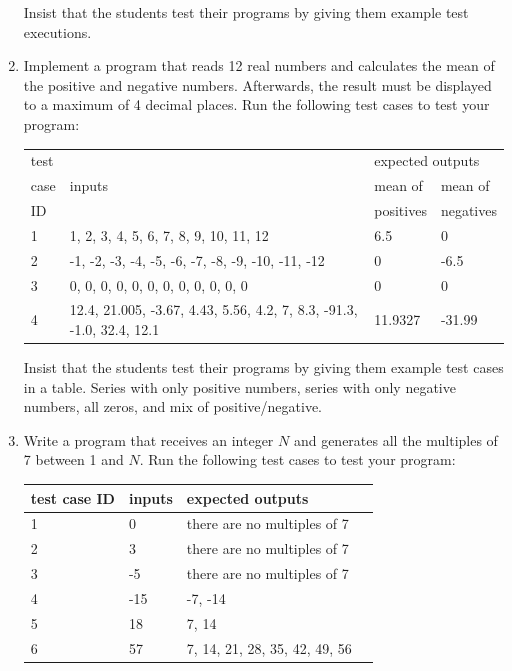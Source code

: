 \documentclass[
  fontsize=10pt,
  a4paper,
]{scrartcl}
\newenvironment{howTILEd}%
  {\begin{mdframed}[skipabove=10pt,skipbelow=10pt,backgroundcolor=pink!40]}%
  {\end{mdframed}}
\begin{document}
\begin{enumerate}
\begin{howTILEd}
Insist that the students test their programs by giving them example test executions. 
\end{howTILEd}



\item Implement a program that reads 12 real numbers and calculates the mean of the positive and negative numbers. Afterwards, the result must be displayed to a maximum of 4 decimal places. Run the following test cases to test your program:

\begin{tabular}{|l|l|l|l|}
\hline
test  & \multirow{3}{*}{inputs} & \multicolumn{2}{l|}{expected outputs}  \\ \cline{3-4} 
case     &  & mean of & mean of     \\
ID       &  & positives & negatives    \\
\hline\hline
1 & 1, 2, 3, 4, 5, 6, 7, 8, 9, 10, 11, 12  &  6.5 & 0  \\
2 & -1, -2, -3, -4, -5, -6, -7, -8, -9, -10, -11, -12  &  0 & -6.5  \\
3 & 0, 0, 0, 0, 0, 0, 0, 0, 0, 0, 0, 0 & 0 & 0 \\
4 & 12.4, 21.005, -3.67, 4.43, 5.56, 4.2, 7, 8.3, -91.3, -1.0, 32.4, 12.1 & 11.9327 & -31.99\\
\hline
\end{tabular}




\begin{howTILEd}
Insist that the students test their programs by giving them example test cases in a table. Series with only positive numbers, series with only negative numbers, all zeros, and mix of positive/negative.
\end{howTILEd}





\item Write a program that receives an integer $N$ and generates all the multiples of 7 between 1 and $N$. Run the following test cases to test your program:

\begin{tabular}{|l|l|l|l|}
\hline
test case ID  & inputs & expected outputs  \\ 
\hline\hline
1 & 0 & there are no multiples of 7\\
2 & 3 & there are no multiples of 7\\
3 & -5 & there are no multiples of 7\\
4 & -15 & -7, -14\\
5 & 18 & 7, 14\\
6 & 57 & 7, 14, 21, 28, 35, 42, 49, 56\\
\hline
\end{tabular}


\end{enumerate}
\end{document}
